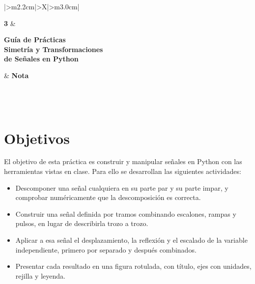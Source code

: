 \documentclass[11pt,a4paper]{article}
\begin{document}
\begingroup
\renewcommand{\tabularxcolumn}[1]{m{#1}}
\renewcommand{\arraystretch}{2.0}
\setlength{\tabcolsep}{12pt}
\noindent
\begin{tabularx}{\textwidth}{|>{\centering\arraybackslash}m{2.2cm}|>{\centering\arraybackslash}X|>{\centering\arraybackslash}m{3.0cm}|}
\hline
\rule{0pt}{2.1cm}{\fontsize{58}{58}\selectfont\bfseries 3}
    & \begin{minipage}[c]{\linewidth}\centering
          {\large\bfseries Guía de Prácticas}\\[7pt]
          {\Large\bfseries Simetría y Transformaciones\\ de Señales en Python}
      \end{minipage}
    & {\Large\bfseries Nota}\\
\hline
{}\\
\hline
{}\\
\\
\hline
\end{tabularx}
\endgroup

\vspace{0.8cm}

\section{Objetivos}
El objetivo de esta práctica es construir y manipular señales en Python con las
herramientas vistas en clase. Para ello se desarrollan las siguientes actividades:

\begin{itemize}
    \item Descomponer una señal cualquiera en su parte par y su parte impar, y
          comprobar numéricamente que la descomposición es correcta.
    \item Construir una señal definida por tramos combinando escalones, rampas y
          pulsos, en lugar de describirla trozo a trozo.
    \item Aplicar a esa señal el desplazamiento, la reflexión y el escalado de la
          variable independiente, primero por separado y después combinados.
    \item Presentar cada resultado en una figura rotulada, con título, ejes con
          unidades, rejilla y leyenda.
\end{itemize}
\end{document}
